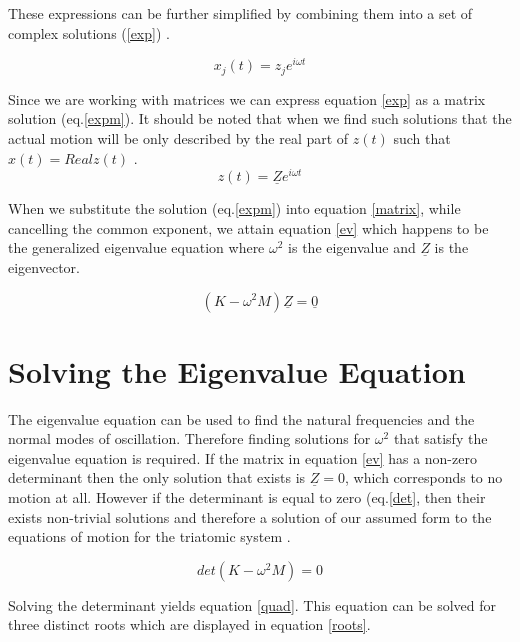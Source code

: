 \documentclass[hidelinks]{article}
\begin{document}
\begin{multicols}{2}
These expressions can be further simplified by combining them into a set of complex solutions (\ref{exp}) \cite{1}. 

\begin{equation}
\label{exp}
x_j(t) = z_je^{i\omega t}
\end{equation}

Since we are working with matrices we can express equation \ref{exp} as a matrix solution (eq.\ref{expm}). It should be noted that when we find such solutions that the actual motion will be only described by the real part of $z(t)$ such that $x(t)=Realz(t)$ \cite{1}.
\begin{equation}
\label{expm}
z(t) = \underline{Z}e^{i\omega t}
\end{equation}

When we substitute the solution (eq.\ref{expm}) into equation \ref{matrix}, while cancelling the common exponent, we attain equation \ref{ev} which happens to be the generalized eigenvalue equation where $\omega^2$ is the eigenvalue and $\underline{Z}$ is the eigenvector.


\begin{equation}
\label{ev}
(K-\omega^2M)\underline{Z}=\underline{0}
\end{equation}



\section{Solving the Eigenvalue Equation}

The eigenvalue equation can be used to find the natural frequencies and the normal modes of oscillation. Therefore finding solutions for $\omega^2$ that satisfy the eigenvalue equation is required. If the matrix in equation \ref{ev} has a non-zero determinant then the only solution that exists is $\underline{Z}=0$, which corresponds to no motion at all. However if the determinant is equal to zero (eq.\ref{det}, then their exists non-trivial solutions and therefore a solution of our assumed form to the equations of motion for the triatomic system \cite{1}.

\begin{equation}
\label{det}
det(K-\omega^2M)=0
\end{equation}

Solving the determinant yields equation \ref{quad}. This equation can be solved for three distinct roots which are displayed in equation \ref{roots}.


\end{multicols}
\end{document}
